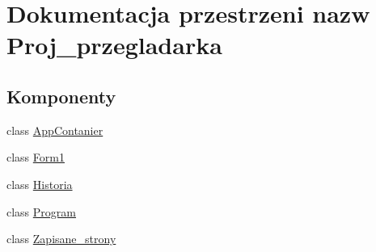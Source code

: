 \hypertarget{namespace_proj__przegladarka}{}\section{Dokumentacja przestrzeni nazw Proj\+\_\+przegladarka}
\label{namespace_proj__przegladarka}
\subsection*{Komponenty}
\begin{DoxyCompactItemize}
\item 
class \mbox{\hyperlink{class_proj__przegladarka_1_1_app_contanier}{App\+Contanier}}
\item 
class \mbox{\hyperlink{class_proj__przegladarka_1_1_form1}{Form1}}
\item 
class \mbox{\hyperlink{class_proj__przegladarka_1_1_historia}{Historia}}
\item 
class \mbox{\hyperlink{class_proj__przegladarka_1_1_program}{Program}}
\item 
class \mbox{\hyperlink{class_proj__przegladarka_1_1_zapisane__strony}{Zapisane\+\_\+strony}}
\end{DoxyCompactItemize}
